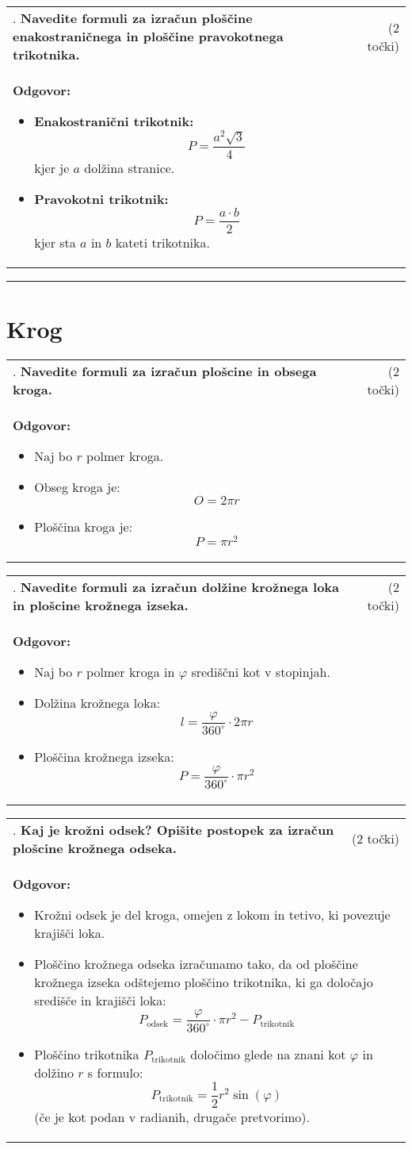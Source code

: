 \documentclass[12pt]{article}
\newcounter{vprasanje}[section]
\renewcommand{\thevprasanje}{\roman{vprasanje}}
\newcommand{\vprasanje}[2]{%
  \stepcounter{vprasanje}%
  \textbf{\thevprasanje}. \textbf{#1} & (#2) \\
}
\newcommand{\odgovor}[1]{%
  \multicolumn{2}{p{\dimexpr\textwidth-2\tabcolsep\relax}}{%
    \small \textbf{Odgovor:} #1%
  } \\[1em]%
}
\newcommand{\crta}{\rule{\textwidth}{0.4pt}}
\newcommand{\naslov}[1]{%
  \vspace{1em} 
  \section{#1}
  \addcontentsline{toc}{section}{\protect\numberline{}#1}%
}
\newcommand{\razmak}[1]{%
  \vspace{#1}
}
\begin{document}
\begin{tabularx}{\textwidth}{X r}
\vprasanje{Navedite formuli za izračun ploščine enakostraničnega in ploščine pravokotnega trikotnika.}{2 točki}
\odgovor{
\begin{itemize}
  \item \textbf{Enakostranični trikotnik:}
  \[
  P = \frac{a^2 \sqrt{3}}{4}
  \]
  kjer je $a$ dolžina stranice.

  \item \textbf{Pravokotni trikotnik:}
  \[
  P = \frac{a \cdot b}{2}
  \]
  kjer sta $a$ in $b$ kateti trikotnika.
\end{itemize}
}
\end{tabularx}

\razmak{0.5em}


\crta

\naslov{Krog}

\begin{tabularx}{\textwidth}{X r}
\vprasanje{Navedite formuli za izračun plošcine in obsega kroga.}{2 točki}
\odgovor{
\begin{itemize}
  \item Naj bo $r$ polmer kroga.
  \item Obseg kroga je:
  \[
  O = 2\pi r
  \]
  \item Ploščina kroga je:
  \[
  P = \pi r^2
  \]
\end{itemize}
}
\end{tabularx}

\begin{tabularx}{\textwidth}{X r}
\vprasanje{Navedite formuli za izračun dolžine krožnega loka in plošcine krožnega izseka.}{2 točki}
\odgovor{
\begin{itemize}
  \item Naj bo $r$ polmer kroga in $\varphi$ središčni kot v stopinjah.
  \item Dolžina krožnega loka:
  \[
  l = \frac{\varphi}{360^\circ} \cdot 2\pi r
  \]
  \item Ploščina krožnega izseka:
  \[
  P = \frac{\varphi}{360^\circ} \cdot \pi r^2
  \]
\end{itemize}
}
\end{tabularx}

\begin{tabularx}{\textwidth}{X r}
\vprasanje{Kaj je krožni odsek? Opišite postopek za izračun plošcine krožnega odseka.}{2 točki}
\odgovor{
\begin{itemize}
  \item Krožni odsek je del kroga, omejen z lokom in tetivo, ki povezuje krajišči loka.
  \item Ploščino krožnega odseka izračunamo tako, da od ploščine krožnega izseka odštejemo ploščino trikotnika, ki ga določajo središče in krajišči loka:
  \[
  P_{\text{odsek}} = \frac{\varphi}{360^\circ} \cdot \pi r^2 - P_{\text{trikotnik}}
  \]
  \item Ploščino trikotnika $P_{\text{trikotnik}}$ določimo glede na znani kot $\varphi$ in dolžino $r$ s formulo:
  \[
  P_{\text{trikotnik}} = \frac{1}{2} r^2 \sin(\varphi)
  \]
  (če je kot podan v radianih, drugače pretvorimo).
\end{itemize}
}
\end{tabularx}
\end{document}
